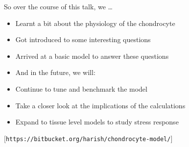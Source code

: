 \documentclass{beamer}
\newcommand{\references}[1] {
  \begin{flushright}
    \scriptsize [#1] \normalsize
  \end{flushright}
}
\begin{document}

\begin{frame}{So over the course of this talk, we \ldots}

  \begin{itemize}
  \item Learnt a bit about the physiology of the chondrocyte
  \item Got introduced to some interesting questions
  \item Arrived at a basic model to answer these questions\\[0.5cm]
  \end{itemize}

  \pause

  \begin{itemize}
    \item<2->[] \hspace{-0.5cm} And in the future, we will:
  \item<2-> Continue to tune and benchmark the model
  \item<2-> Take a closer look at the implications of the calculations
  \item<2-> Expand to tissue level models to study stress response
  \end{itemize}

  \references{{\tt https://bitbucket.org/harish/chondrocyte-model/}}

\end{frame}
\end{document}

